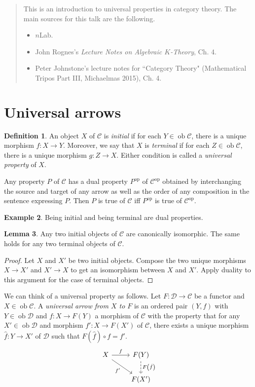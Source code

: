 \documentclass[10pt,letterpaper,cm]{nupset}
\theoremstyle{definition}
\newtheorem{definition}{Definition}[section]
\newtheorem{exmp}[definition]{Example}
\theoremstyle{theorem}
\newtheorem{lemma}[definition]{Lemma}
\theoremstyle{remark}
\newcommand{\1}{\mathbf{1}}
\renewcommand{\c}{\mathscr{C}}
\renewcommand{\d}{\mathscr{D}}
\newcommand{\0}{\vec 0}
\DeclareMathOperator{\op}{op}
\DeclareMathOperator{\ob}{ob}
\begin{document}
\begin{abstract}
This is an introduction to universal properties in category theory. The main sources for this talk are the following.
\begin{itemize}
\item $n$Lab.
\item John Rognes's \textit{Lecture Notes on Algebraic $K$-Theory}, Ch. 4.
\item Peter Johnstone's lecture notes for ``Category Theory" (Mathematical Tripos Part III, Michaelmas 2015), Ch. 4.
\end{itemize}
\end{abstract}

\smallskip

\section{Universal arrows}

\begin{definition}
An object $X$ of $\c$ is \textit{initial} if for each $Y \in \ob \c$, there is a unique morphism $f : X \to Y$. Moreover, we say that $X$ is \textit{terminal} if for each $Z \in \ob \c$, there is a unique morphism $g : Z \to X$. Either condition is called a \textit{universal property} of $X$.
\end{definition}


Any property $P$ of $\c$ has a dual property $P^{\op}$ of $\c^{\op}$ obtained by interchanging the source and target of any arrow as well as the order of any composition in the sentence expressing $P$. Then $P$ is true of $\c$ iff $P^{\op}$ is true of $\c^{\op}$.


\begin{exmp}
Being initial and being terminal are dual properties.
\end{exmp}

\begin{lemma}\label{initial}
Any two initial objects of $\c$ are canonically isomorphic. The same holds for any two terminal objects of $\c$.
\end{lemma}
\begin{proof}
Let $X$ and $X'$ be two initial objects. Compose the two unique morphisms $X\to X'$ and $X'\to X$ to get an isomorphism between $X$ and $X'$. Apply duality to this argument for the case of terminal objects.
\end{proof}


We can think of a universal property as follows.  Let $F : \d \to \c$ be a functor and $X \in \ob \c$. A \textit{universal arrow from $X$ to $F$} is an ordered pair $\left(Y, f\right)$ with $Y \in \ob \d$ and $f : X \to F(Y)$ a morphism of $\c$ with the property that for any $X' \in \ob \d$ and morphism $f' : X \to F(X')$ of $\c$, there exists a unique morphism $\hat{f} : Y \to X'$ of $\d$ such that $F\left(\hat{f}\right) \circ f = f'$.
\[ \begin{tikzcd}
X \arrow[r, "f"] \arrow[swap, dr,  " f' "] & F(Y) \arrow[d, dashed, "F\left(\hat{f}\right)"] \\%
 & F(X')
\end{tikzcd}
\]
\end{document}
